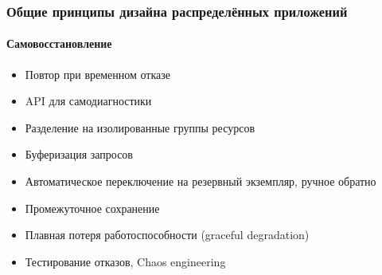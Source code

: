 \documentclass{../../slides-style}
\begin{document}
    \begin{frame}
        \frametitle{Общие принципы дизайна распределённых приложений}
        \framesubtitle{Самовосстановление}
        \begin{itemize}
            \item Повтор при временном отказе
            \item API для самодиагностики
            \item Разделение на изолированные группы ресурсов
            \item Буферизация запросов
            \item Автоматическое переключение на резервный экземпляр, ручное обратно
            \item Промежуточное сохранение
            \item Плавная потеря работоспособности (graceful degradation)
            \item Тестирование отказов, Chaos engineering
        \end{itemize}
    \end{frame}
\end{document}
